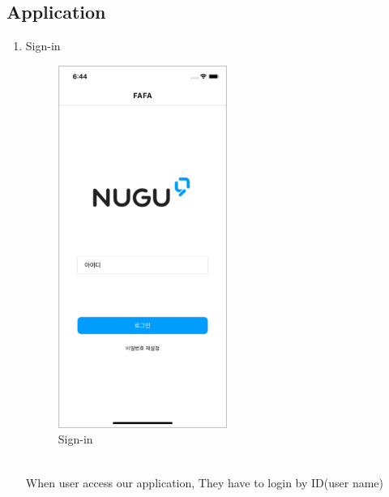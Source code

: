 \documentclass[conference]{IEEEtran}
\begin{document}
\subsection{Application}
\begin{enumerate}
    \item Sign-in\\
    \begin{figure}[htbp]
    \centering
    \includegraphics{images/f8.png}
    \caption{Sign-in}
    \end{figure}\\
    When user access our application, They have to login by ID(user name)\\
    

\end{enumerate}
\end{document}
